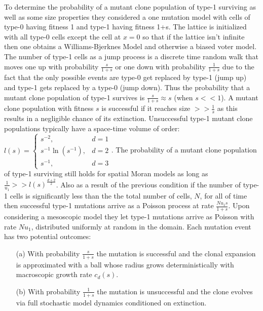 \documentclass[\main/thesis.tex]{subfiles}
\begin{document}
To determine the probability of a mutant clone population of type-1 
surviving as well as some size properties they considered a one mutation 
model with cells of type-0 having fitness 1 and type-1 having fitness 1+s. The 
lattice is initialized with all type-0 cells except the cell at $x{=}0$ so that 
if the lattice isn't infinite then one obtains a Williams-Bjerknes Model and 
otherwise a biased voter model. The number of type-1 cells as a jump process is 
a discrete time random walk that moves one up with probability $\frac{s}{1{+}s}$ 
or one down with probability $\frac{1}{1{+}s}$ due to the fact that the only 
possible events are type-0 get replaced by type-1 (jump up) and type-1 gets 
replaced by a type-0 (jump down). Thus the probability that a mutant clone 
population of type-1 survives is $\frac{s}{1{+}s} \approx s$ (when $s << 1$). A 
mutant clone population with fitness $s$ is successful if it reaches size
$>> \frac{1}{s}$ as this results in a negligible chance of its extinction. 
Unsuccessful type-1 mutant clone populations typically have a space-time volume 
of order:
$l(s) {=} \begin{cases}
            s^{-2}, & d{=}1 \\
            s^{-1}\ln(s^{-1}), & d{=}2 \\
            s^{-1}, & d{=} 3 
          \end{cases}$.
The probability of a mutant clone population of type-1 surviving still holds for 
spatial Moran models as long as $\frac{1}{u_1} >> l(s)^{\frac{d{+}2}{2}}$. 
Also as a result of the previous condition if the number of type-1 cells is 
significantly less than the the total number of cells, $N$, for all of time then 
successful type-1 mutations arrive as a Poisson process at rate 
$\frac{Nu_1s}{1{+}s}$. Upon considering a mesoscopic model they let type-1 
mutations arrive as Poisson with rate $Nu_1$, distributed uniformly at random in 
the domain. Each mutation event has two potential outcomes:
\begin{itemize}
  \item[(a)] With probability $\frac{s}{1{+}s}$ the mutation is successful and 
             the clonal expansion is approximated with a ball whose radius grows 
             deterministically with macroscopic growth rate $c_d(s)$.
  \item[(b)] With probability $\frac{1}{1{+}s}$ the mutation is unsuccessful and 
             the clone evolves via full stochastic model dynamics conditioned 
             on extinction.
\end{itemize}
\end{document}
